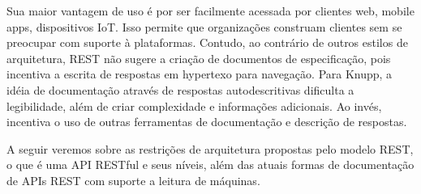 Sua maior vantagem de uso é por ser facilmente acessada por clientes web, mobile apps, dispositivos IoT. Isso permite que organizações construam clientes sem se preocupar com suporte à plataformas. Contudo, ao contrário de outros estilos de arquitetura, REST não sugere a criação de documentos de especificação, pois incentiva a escrita de respostas em hypertexo para navegação. Para Knupp, a idéia de documentação através de respostas autodescritivas dificulta a legibilidade, além de criar complexidade e informações adicionais. Ao invés, incentiva o uso de outras ferramentas de documentação e descrição de respostas. \cite{Knupp2016}

A seguir veremos sobre as restrições de arquitetura propostas pelo modelo REST, o que é uma API RESTful e seus níveis, além das atuais formas de documentação de APIs REST com suporte a leitura de máquinas.




